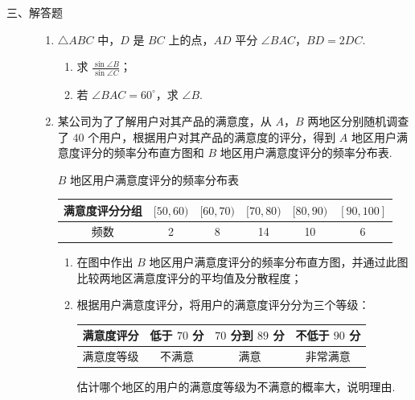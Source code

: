 \begin{description}

    \item[三、解答题]

    \begin{enumerate}[leftmargin=5pt]

      \addtocounter{enumi}{+16}

        \item \(\triangle ABC\) 中，\(D\) 是 \(BC\) 上的点，\(AD\) 平分 \(\angle BAC\)，\(BD = 2DC\).
\begin{enumerate}
\item 求 \(\frac{\sin\angle B}{\sin\angle C}\)；
\item 若 \(\angle BAC = 60^{\circ}\)，求 \(\angle B\).
\end{enumerate}

        \item 某公司为了了解用户对其产品的满意度，从 \(A\)，\(B\) 两地区分别随机调查了 \(40\) 个用户，根据用户对其产品的满意度的评分，得到 \(A\) 地区用户满意度评分的频率分布直方图和 \(B\) 地区用户满意度评分的频率分布表.

\begin{center}
\(B\) 地区用户满意度评分的频率分布表
\begin{tabular}{c|ccccc}
\hline
满意度评分分组 & \([50, 60)\) & \([60, 70)\) & \([70, 80)\) & \([80, 90)\) & \([90, 100]\) \\
\hline
频数 & 2 & 8 & 14 & 10 & 6 \\
\hline
\end{tabular}
\end{center}

\begin{enumerate}
\item 在图中作出 \(B\) 地区用户满意度评分的频率分布直方图，并通过此图比较两地区满意度评分的平均值及分散程度；
\item 根据用户满意度评分，将用户的满意度评分分为三个等级：

\begin{center}
\begin{tabular}{c|ccc}
\hline
满意度评分 & 低于 \(70\) 分 & \(70\) 分到 \(89\) 分 & 不低于 \(90\) 分 \\
\hline
满意度等级 & 不满意 & 满意 & 非常满意 \\
\hline
\end{tabular}
\end{center}

估计哪个地区的用户的满意度等级为不满意的概率大，说明理由.
\end{enumerate}


\end{enumerate}
\end{description}
